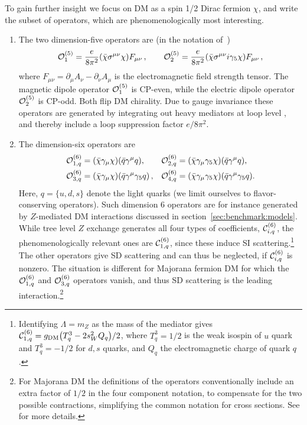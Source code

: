 To gain  further insight we focus on DM as a spin 1/2 Dirac fermion $\chi$, 
and write the subset of operators, which are phenomenologically  most interesting.  
\begin{enumerate}
\item[5)] The two dimension-five operators  are (in the notation of~\cite{Brod:2017bsw})
\begin{equation}
\label{eq:dim5:nf5:Q1Q2:light}
{\cal O}_{1}^{(5)} = \frac{e}{8 \pi^2} (\bar \chi \sigma^{\mu\nu}\chi)
 F_{\mu\nu} \,, \qquad {\cal O}_2^{(5)} = \frac{e }{8 \pi^2} (\bar
\chi \sigma^{\mu\nu} i\gamma_5 \chi) F_{\mu\nu} \,,
\end{equation}
where $F_{\mu\nu}=\partial_\mu A_\nu-\partial_\nu A_\mu$ is the electromagnetic field strength tensor.  
The magnetic dipole operator ${\cal O}_1^{(5)}$ is CP-even, while the electric
dipole operator ${\cal O}_2^{(5)}$ is CP-odd. 
Both flip DM chirality.
Due to gauge invariance these operators are generated 
by integrating out heavy mediators at loop level \cite{DM:EM:moments},
and thereby include a loop suppression factor $e/8\pi^2$.


\item[6)] The dimension-six operators are
\begin{align}
{\cal O}_{1,q}^{(6)} & = (\bar \chi \gamma_\mu \chi) (\bar q \gamma^\mu q),
 &{\cal O}_{2,q}^{(6)} &= (\bar \chi\gamma_\mu\gamma_5 \chi)(\bar q \gamma^\mu q), \label{eq:dim6EW:Q1Q2:light}
  \\ 
{\cal O}_{3,q}^{(6)} & = (\bar \chi \gamma_\mu \chi)(\bar q \gamma^\mu \gamma_5 q)\,,
  & {\cal O}_{4,q}^{(6)}& = (\bar
\chi\gamma_\mu\gamma_5 \chi)(\bar q \gamma^\mu \gamma_5 q).\label{eq:dim6EW:Q3Q4:light}
\end{align}
Here, $q=\{u,d,s\}$ denote the light quarks (we limit ourselves
to flavor-conserving operators).  Such dimension 6 operators are for instance generated by $Z$-mediated DM interactions discussed in  section~\ref{sec:benchmark:models}. 
While tree level $Z$ exchange generates all four types of coefficients, ${\cal C}_{i,q}^{(6)}$, the phenomenologically relevant ones are ${\cal C}_{1,q}^{(6)}$, since these induce SI scattering.\footnote{Identifying $\Lambda=m_Z$ as the mass of the mediator gives  ${\cal C}_{1,q}^{(6)}=g_{\rm DM}\big(T^3_q-2 s_W^2 Q_q\big)/2$, where $T^3_q=1/2$ is the weak isospin of $u$ quark and $T^3_q=-1/2$ for $d,s$ quarks, and $Q_q$ the electromagnetic charge of quark $q$.} The other operators give SD scattering and can thus be neglected, if ${\cal C}_{i,q}^{(6)}$ is nonzero. The situation is different for Majorana fermion DM for which the  ${\cal O}_{1,q}^{(6)}$ and ${\cal O}_{3,q}^{(6)}$ operators vanish, and thus SD scattering is the leading interaction.\footnote{For Majorana DM the definitions of the operators conventionally include an extra factor of $1/2$ in the four component notation, to compensate for the two possible contractions, simplifying the common notation for cross sections. See \cite{Bishara:2017nnn} for more details.} 


\end{enumerate}
